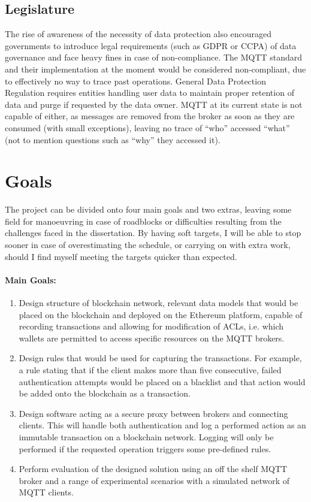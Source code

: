 \subsection{Legislature}
The rise of awareness of the necessity of data protection also encouraged governments to introduce legal requirements (such as GDPR or CCPA) of data governance and face heavy fines in case of non-compliance. The MQTT standard and their implementation at the moment would be considered non-compliant, due to effectively no way to trace past operations. General Data Protection Regulation requires entities handling user data to maintain proper retention of data and purge if requested by the data owner. MQTT at its current state is not capable of either, as messages are removed from the broker as soon as they are consumed (with small exceptions), leaving no trace of ``who'' accessed ``what'' (not to mention questions such as ``why'' they accessed it).


\section{Goals}

The project can be divided onto four main goals and two extras, leaving some field for manoeuvring in case of roadblocks or difficulties resulting from the challenges faced in the dissertation. By having soft targets, I will be able to stop sooner in case of overestimating the schedule, or carrying on with extra work, should I find myself meeting the targets quicker than expected. 

\paragraph{Main Goals:}
\begin{enumerate}
  \item Design structure of blockchain network, relevant data models that would be placed on the blockchain and deployed on the Ethereum platform, capable of recording transactions and allowing for modification of ACLs, i.e. which wallets are permitted to access specific resources on the MQTT brokers.
  \item Design rules that would be used for capturing the transactions. For example, a rule stating that if the client makes more than five consecutive, failed authentication attempts would be placed on a blacklist and that action would be added onto the blockchain as a transaction. 
  \item Design software acting as a secure proxy between brokers and connecting clients. This will handle both authentication and log a performed action as an immutable transaction on a blockchain network. Logging will only be performed if the requested operation triggers some pre-defined rules.
  \item Perform evaluation of the designed solution using an off the shelf MQTT broker and a range of experimental scenarios with a simulated network of MQTT clients.
\end{enumerate}


